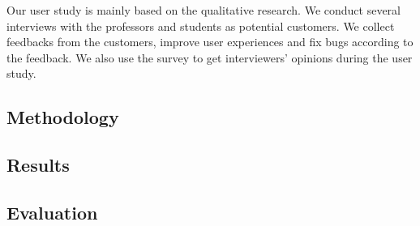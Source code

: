 Our user study is mainly based on the qualitative research.
We conduct several interviews with the professors and students as potential customers.
We collect feedbacks from the customers, improve user experiences and fix bugs according to the feedback.
We also use the survey to get interviewers' opinions during the user study.

\subsection{Methodology}

\subsection{Results}

\subsection{Evaluation} %

